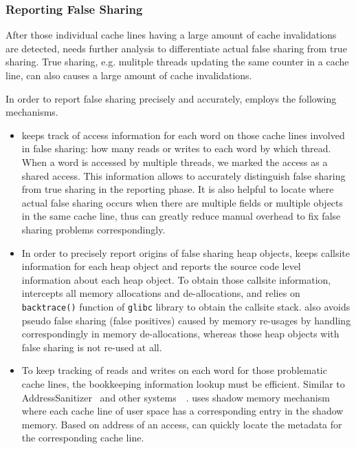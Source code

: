 \subsubsection{Reporting False Sharing}
After those individual cache lines having a large amount of cache
invalidations are detected,
 needs further analysis to differentiate actual false sharing from true sharing. 
True sharing, e.g. mulitple threads updating 
the same counter in a cache line, can also causes a large amount of cache invalidations.

In order to report false sharing precisely and accurately,  
\Defaults{} employs the following mechanisms. 
\begin{itemize}
\item
{} keeps track of access information for each word on those
cache lines involved in false sharing: 
how many reads or writes to each word by which thread. 
When a word is accessed by multiple threads,
we marked the access as a shared access. This information 
allows  to accurately distinguish false sharing from true sharing 
in the reporting phase.
It is also helpful to locate where 
actual false sharing occurs when there are multiple fields or multiple objects 
in the same cache line, thus can greatly reduce manual overhead to fix false sharing problems
correspondingly. 

\item
In order to precisely report origins of false sharing heap objects, 
keeps callsite information for each heap object and reports the source code level
information about each heap object. To obtain those callsite information, 
intercepts all memory allocations and de-allocations, and relies on \texttt{backtrace()} 
function of \texttt{glibc} library to obtain the callsite stack. 
 also avoids pseudo false sharing (false positives) caused by memory re-usages 
by handling correspondingly in memory de-allocations, whereas those heap objects with false 
sharing is not re-used at all.

\item
To keep tracking of reads and writes on each word for those problematic cache lines,
the bookkeeping information lookup must be efficient.
Similar to 
AddressSanitizer~\cite{Addresssanitizer} and other systems~\cite{qinzhaodetection}~\cite{Valgrind}. 
 uses shadow memory mechanism 
where each cache line of user space has a corresponding entry in the shadow memory. 
Based on address of an access,  can quickly locate
the metadata for the corresponding cache line.


\end{itemize}
